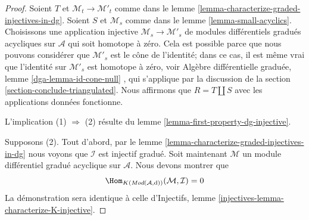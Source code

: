 \begin{proof}
Soient $T$ et $\mathcal{M}_t \to \mathcal{M}'_t$ comme dans le lemme \ref{lemma-characterize-graded-injectives-in-dg}.
Soient $S$ et $\mathcal{M}_s$ comme dans le lemme \ref{lemma-small-acyclics}.
Choisissons une application injective $\mathcal{M}_s \to \mathcal{M}'_s$ de modules différentiels gradués acycliques sur $\mathcal{A}$ qui soit homotope à zéro.
Cela est possible parce que nous pouvons considérer que $\mathcal{M}'_s$ est le cône de l'identité; dans ce cas, il est même vrai que l'identité sur $\mathcal{M}'_s$ est homotope à zéro, voir Algèbre différentielle graduée, lemme \ref{dga-lemma-id-cone-null} , qui s'applique par la discussion de la section \ref{section-conclude-triangulated}.
Nous affirmons que $R = T \coprod S$ avec les applications données fonctionne.

\medskip\noindent
L'implication (1) $\Rightarrow$ (2) résulte du lemme \ref{lemma-first-property-dg-injective}.

\medskip\noindent
Supposons (2).
Tout d'abord, par le lemme \ref{lemma-characterize-graded-injectives-in-dg}  nous voyons que $\mathcal{I}$ est injectif gradué.
Soit maintenant $\mathcal{M}$ un module différentiel gradué acyclique sur $\mathcal{A}$.
Nous devons montrer que
$$
\Hom_{K(\textit{Mod}(\mathcal{A}, \text{d}))}(\mathcal{M}, \mathcal{I}) = 0
$$
La démonstration sera identique à celle d'Injectifs, lemme \ref{injectives-lemma-characterize-K-injective}.


\end{proof}
